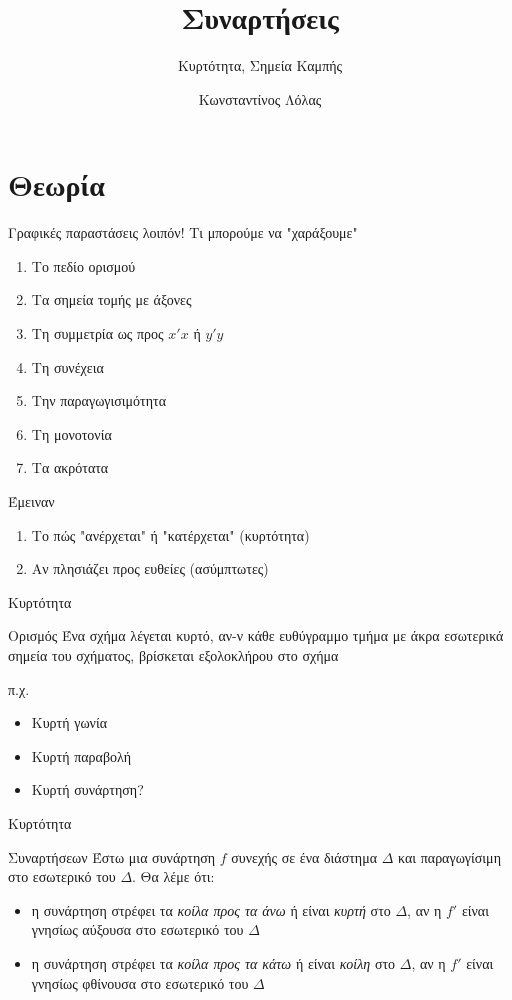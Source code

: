 \documentclass{presentation}
\title{Συναρτήσεις}
\subtitle{Κυρτότητα, Σημεία Καμπής}
\author[Λόλας]{Κωνσταντίνος Λόλας}
\begin{document}
\begin{frame}
  \titlepage
\end{frame}

\section{Θεωρία}
\begin{frame}{Γραφικές παραστάσεις λοιπόν!}
  Τι μπορούμε να "χαράξουμε"
  \begin{enumerate}
    \item Το πεδίο ορισμού
    \item Τα σημεία τομής με άξονες
    \item Τη συμμετρία ως προς $x'x$ ή $y'y$
    \item Τη συνέχεια
    \item Την παραγωγισιμότητα
    \item Τη μονοτονία
    \item Τα ακρότατα
  \end{enumerate}
   Έμειναν
  \begin{enumerate}
    \item<3-> Το πώς "ανέρχεται" ή "κατέρχεται" (κυρτότητα)
    \item<4-> Αν πλησιάζει προς ευθείες (ασύμπτωτες)
  \end{enumerate}
\end{frame}

\begin{frame}{Κυρτότητα}
  \begin{block}{Ορισμός}
    Ένα σχήμα λέγεται κυρτό, αν-ν κάθε ευθύγραμμο τμήμα με άκρα εσωτερικά σημεία του σχήματος, βρίσκεται εξολοκλήρου στο σχήμα
  \end{block}
   π.χ.
  \begin{itemize}
    \item<3-> Κυρτή γωνία 
    \item<5-> Κυρτή παραβολή 
    \item<7-> Κυρτή συνάρτηση?
  \end{itemize}
\end{frame}

\begin{frame}{Κυρτότητα}
  \begin{block}{Συναρτήσεων}
    Έστω μια συνάρτηση $f$ συνεχής σε ένα διάστημα $Δ$ και παραγωγίσιμη στο εσωτερικό του $Δ$. Θα λέμε ότι:
    \begin{itemize}
      \item η συνάρτηση στρέφει τα \emph{κοίλα προς τα άνω} ή είναι \emph{κυρτή} στο $Δ$, αν η $f'$ είναι γνησίως αύξουσα στο εσωτερικό του $Δ$
      \item η συνάρτηση στρέφει τα \emph{κοίλα προς τα κάτω} ή είναι \emph{κοίλη} στο $Δ$, αν η $f'$ είναι γνησίως φθίνουσα στο εσωτερικό του $Δ$
    \end{itemize}
  \end{block}
\end{frame}
\end{document}

